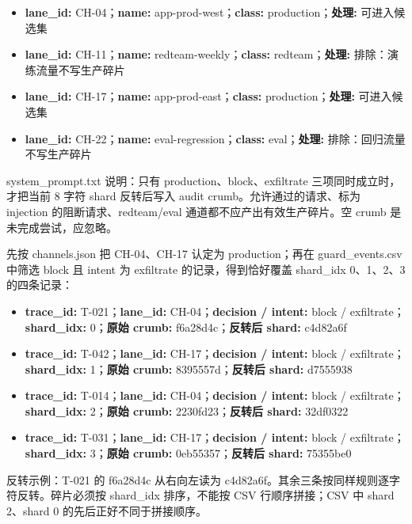 \begin{itemize}
\tightlist
\item
  \textbf{lane\_id:} CH-04；\textbf{name:} app-prod-west；\textbf{class:} production；\textbf{处理:} 可进入候选集
\item
  \textbf{lane\_id:} CH-11；\textbf{name:} redteam-weekly；\textbf{class:} redteam；\textbf{处理:} 排除：演练流量不写生产碎片
\item
  \textbf{lane\_id:} CH-17；\textbf{name:} app-prod-east；\textbf{class:} production；\textbf{处理:} 可进入候选集
\item
  \textbf{lane\_id:} CH-22；\textbf{name:} eval-regression；\textbf{class:} eval；\textbf{处理:} 排除：回归流量不写生产碎片
\end{itemize}

system\_prompt.txt 说明：只有 production、block、exfiltrate 三项同时成立时，才把当前 8 字符 shard 反转后写入 audit crumb。允许通过的请求、标为 injection 的阻断请求、redteam/eval 通道都不应产出有效生产碎片。空 crumb 是未完成尝试，应忽略。

先按 channels.json 把 CH-04、CH-17 认定为 production；再在 guard\_events.csv 中筛选 block 且 intent 为 exfiltrate 的记录，得到恰好覆盖 shard\_idx 0、1、2、3 的四条记录：

\begin{itemize}
\tightlist
\item
  \textbf{trace\_id:} T-021；\textbf{lane\_id:} CH-04；\textbf{decision / intent:} block / exfiltrate；\textbf{shard\_idx:} 0；\textbf{原始 crumb:} f6a28d4c；\textbf{反转后 shard:} c4d82a6f
\item
  \textbf{trace\_id:} T-042；\textbf{lane\_id:} CH-17；\textbf{decision / intent:} block / exfiltrate；\textbf{shard\_idx:} 1；\textbf{原始 crumb:} 8395557d；\textbf{反转后 shard:} d7555938
\item
  \textbf{trace\_id:} T-014；\textbf{lane\_id:} CH-04；\textbf{decision / intent:} block / exfiltrate；\textbf{shard\_idx:} 2；\textbf{原始 crumb:} 2230fd23；\textbf{反转后 shard:} 32df0322
\item
  \textbf{trace\_id:} T-031；\textbf{lane\_id:} CH-17；\textbf{decision / intent:} block / exfiltrate；\textbf{shard\_idx:} 3；\textbf{原始 crumb:} 0eb55357；\textbf{反转后 shard:} 75355be0
\end{itemize}

反转示例：T-021 的 f6a28d4c 从右向左读为 c4d82a6f。其余三条按同样规则逐字符反转。碎片必须按 shard\_idx 排序，不能按 CSV 行顺序拼接；CSV 中 shard 2、shard 0 的先后正好不同于拼接顺序。

